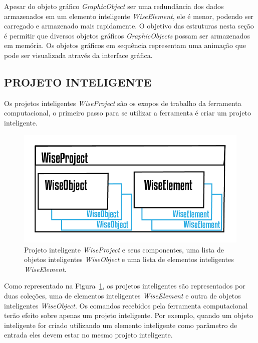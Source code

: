 \documentclass[a4paper,12pt]{monografia}
\theoremstyle{plain}
\theoremstyle{definition}
\theoremstyle{remark}
\begin{document}
Apesar do objeto gráfico \textit{GraphicObject} ser uma redundância dos dados armazenados em um elemento inteligente \textit{WiseElement}, ele é menor, podendo ser carregado e armazenado mais rapidamente. O objetivo das estruturas nesta seção é permitir que diversos objetos gráficos \textit{GraphicObjects} possam ser armazenados em memória. Os objetos gráficos em sequência representam uma animação que pode ser visualizada através da interface gráfica. 


\subsection{PROJETO INTELIGENTE}\label{sec:projeto}

Os projetos inteligentes \textit{WiseProject} são os exopos de trabalho da ferramenta computacional, o primeiro passo para se utilizar a ferramenta é criar um projeto inteligente.


\begin{figure}[!htbp]
	\centering
	\includegraphics[scale=1]{Figures/WiseProject.png}
	\caption{Projeto inteligente \textit{WiseProject} e seus componentes, uma lista de objetos inteligentes \textit{WiseObject} e uma lista de elementos inteligentes \textit{WiseElement}.}
	\label{fig7:project}
\end{figure}

Como representado na Figura~\ref{fig7:project}, os projetos inteligentes são representados por duas coleções, uma de elementos inteligentes \textit{WiseElement} e outra de objetos inteligentes \textit{WiseObject}. Os comandos recebidos pela ferramenta computacional terão efeito sobre apenas um projeto inteligente. Por exemplo, quando um objeto inteligente for criado utilizando um elemento inteligente como parâmetro de entrada eles devem estar no mesmo projeto inteligente.
\end{document}
